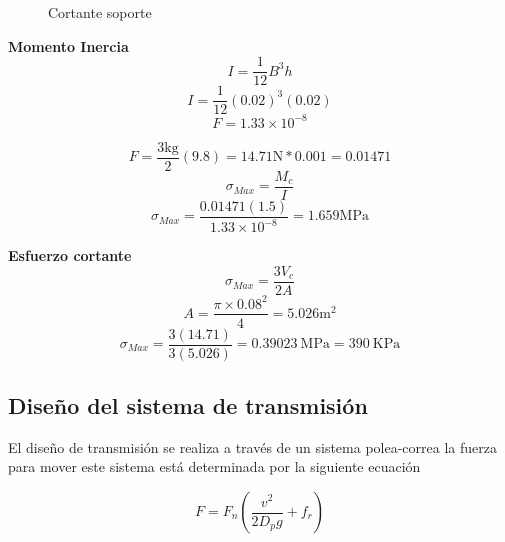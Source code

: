 \begin{figure}[H]
    \centering
    \caption{Cortante soporte}
    \label{fig:cortante}
\end{figure}



\textbf{Momento Inercia}
\vspace{5mm}
\[I=\frac{1}{12}B^3h\]
\[I=\frac{1}{12}(0.02)^3(0.02)\]
\[F=1.33\times 10^{-8} \]

\[F=\frac{3\text{kg}}{2}(9.8)=14.71\text{N}*0.001=0.01471\]
\[\sigma_{Max} =\frac{M_c}{I}\]
\[\sigma_{Max}=\frac{0.01471(1.5)}{1.33\times10^{-8}}=1.659\text{MPa}\]

\textbf{Esfuerzo cortante}\\

\[\sigma_{Max} =\frac{3V_c}{2A}\]
\[A=\frac{\pi\times0.08^2}{4}=5.026\text{m$^2$}\]
\[\sigma_{Max}=\frac{3(14.71)}{3(5.026)}=0.39023\:\text{MPa}=390\:\text{KPa}\]

\subsection{Diseño del sistema de transmisión}

El diseño de transmisión se realiza a través de un sistema polea-correa la fuerza para mover este sistema está determinada por la siguiente ecuación

\begin{equation}
F=F_n(\frac{v^2}{2D_pg}+f_r)
\label{eq:106}
\end{equation}


